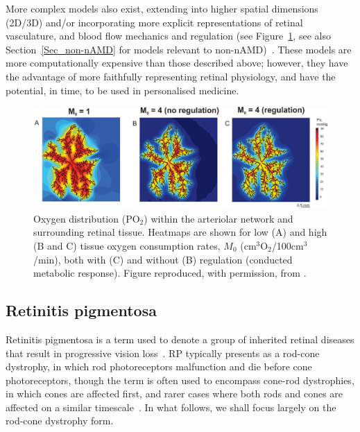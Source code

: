 \documentclass{article}
\begin{document}
More complex models also exist, extending into higher spatial dimensions (2D/3D) and/or incorporating more explicit representations of retinal vasculature, and blood flow mechanics and regulation (see Figure~\ref{Fig_Fry2020}, see also Section~\ref{Sec_non-nAMD} for models relevant to non-nAMD)~\cite{Aquah_et_al_2021,Arciero_et_al_2021,Causin_2015,Friedland_1978,Fry_et_al_2018,Fry_et_al_2020,Linsenmeier_and_Zhang_2017,McDougall_et_al_2012,Watson_et_al_2012}.
These models are more computationally expensive than those described above; however, they have the advantage of more faithfully representing retinal physiology, and have the potential, in time, to be used in personalised medicine.
%
\begin{figure}
\begin{center}
\includegraphics[scale=0.95]{Fry_et_al_2020_Fig_3_ABC}
\end{center}
\caption{Oxygen distribution (PO$_2$) within the arteriolar network and surrounding retinal tissue. Heatmaps are shown for low (A) and high (B and C) tissue oxygen consumption rates, $M_0$ (cm$^3$O$_2$/100cm$^3$/min), both with (C) and without (B) regulation (conducted metabolic response). Figure reproduced, with permission, from \citet{Fry_et_al_2020}.}
\label{Fig_Fry2020}
\end{figure}
%
%
\subsection{Retinitis pigmentosa}\label{Sec_RP}
%
Retinitis pigmentosa is a term used to denote a group of inherited retinal diseases that result in progressive vision loss~\cite{Hamel_2006,Hartong_et_al_2006}. RP typically presents as a rod-cone dystrophy, in which rod photoreceptors malfunction and die before cone photoreceptors, though the term is often used to encompass cone-rod dystrophies, in which cones are affected first, and rarer cases where both rods and cones are affected on a similar timescale~\cite{Hamel_2006,Hartong_et_al_2006}. In what follows, we shall focus largely on the rod-cone dystrophy form.
\end{document}
